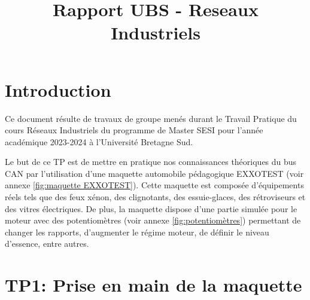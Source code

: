 \documentclass{rapportECC}
\title{Rapport UBS - Reseaux Industriels} %
\begin{document}





        
\fairemarges %
\fairepagedegarde %
\tabledematieres %



\section{Introduction} 

Ce document résulte de travaux de groupe menés durant le Travail Pratique du cours Réseaux Industriels du programme de Master SESI pour l'année académique 2023-2024 à l'Université Bretagne Sud.

Le but de ce TP est de mettre en pratique nos connaissances théoriques du bus CAN par l'utilisation d'une maquette automobile pédagogique EXXOTEST (voir annexe \ref{fig:maquette EXXOTEST}). Cette maquette est composée d'équipements réels tels que des feux xénon, des clignotants, des essuie-glaces, des rétroviseurs et des vitres électriques. De plus, la maquette dispose d'une partie simulée pour le moteur avec des potentiomètres (voir annexe \ref{fig:potentiomètres}) permettant de changer les rapports, d'augmenter le régime moteur, de définir le niveau d'essence, entre autres.


\section{TP1: Prise en main de la maquette}

\end{document}
